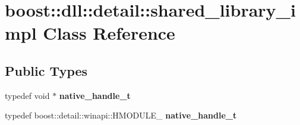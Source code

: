 \hypertarget{a00272}{}\section{boost\+:\+:dll\+:\+:detail\+:\+:shared\+\_\+library\+\_\+impl Class Reference}
\label{a00272}
\subsection*{Public Types}
\begin{DoxyCompactItemize}
\item 
typedef void $\ast$ {\bfseries native\+\_\+handle\+\_\+t}\hypertarget{a00272_a0fb8d4c1967616c6f9c82ce3d70e11c6}{}\label{a00272_a0fb8d4c1967616c6f9c82ce3d70e11c6}

\item 
typedef boost\+::detail\+::winapi\+::\+H\+M\+O\+D\+U\+L\+E\+\_\+ {\bfseries native\+\_\+handle\+\_\+t}\hypertarget{a00272_a2a11230bd7993f39e4fd73ed78a89463}{}\label{a00272_a2a11230bd7993f39e4fd73ed78a89463}

\end{DoxyCompactItemize}

